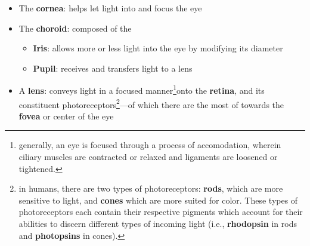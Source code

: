 \documentclass{article}
\begin{document}
\begin{itemize}
	\item The \textbf{cornea}: helps let light into and focus the eye
	\item The \textbf{choroid}: composed of the
		\begin{itemize}
			\item \textbf{Iris}: allows more or less light into the eye by
				modifying its diameter
			\item \textbf{Pupil}: receives and transfers light to a lens
		\end{itemize}
	\item A \textbf{lens}: conveys light in a focused manner\footnote{generally,
			an eye is focused through a process of accomodation,
			wherein ciliary muscles are contracted or relaxed and ligaments are
			loosened or tightened.
		}onto the
		\textbf{retina}, and its constituent photoreceptors\footnote{in humans,
			there are two types of photoreceptors: \textbf{rods}, which are more
			sensitive to light, and \textbf{cones} which are more suited for
			color. These types of photoreceptors each contain their respective
			pigments which account for their abilities to discern different types
			of incoming light (i.e., \textbf{rhodopsin} in rods and
			\textbf{photopsins} in cones).
		}---of which there are
		the most of towards the \textbf{fovea} or center of the eye
\end{itemize}
\end{document}
